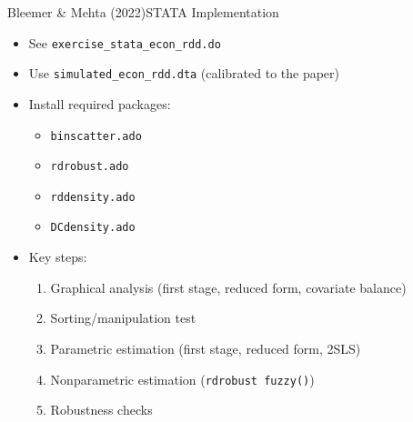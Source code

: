 \documentclass[hyperref={pdfpagelabels=false}]{beamer}
\begin{document}
\begin{frame}{Bleemer \& Mehta (2022)}{STATA Implementation}
	\begin{itemize}
		\item See \texttt{exercise\_stata\_econ\_rdd.do}
		\vspace{0.2cm}
		\item Use \texttt{simulated\_econ\_rdd.dta} (calibrated to the paper)
		\vspace{0.2cm}
		\item Install required packages:
		\begin{itemize}
			\vspace{0.2cm}
			\item \texttt{binscatter.ado}
			\item \texttt{rdrobust.ado}
			\item \texttt{rddensity.ado}
			\item \texttt{DCdensity.ado}
		\end{itemize}
		\vspace{0.2cm}
		\item Key steps:
		\begin{enumerate}
			\vspace{0.2cm}
			\item Graphical analysis (first stage, reduced form, covariate balance)
			\item Sorting/manipulation test
			\item Parametric estimation (first stage, reduced form, 2SLS)
			\item Nonparametric estimation (\texttt{rdrobust fuzzy()})
			\item Robustness checks
		\end{enumerate}
	\end{itemize}
\end{frame}
\end{document}
